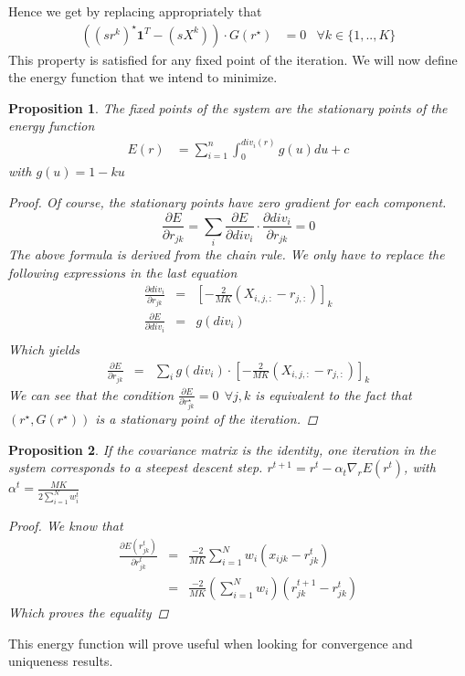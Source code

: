 \documentclass[12pt,a4paper]{article}
\newtheorem{proposition}{Proposition}
\begin{document}
Hence we get by replacing appropriately that
\begin{align*}
((sr^k)^{\star} \mathbf{1}^T - (sX^k))\cdot G(r^{\star}) &= 0 & \forall k\in \{1,..,K\}
\end{align*}
This property is satisfied for any fixed point of the iteration. We will now define the energy function that we intend to minimize.
\begin{proposition}
The fixed points of the system are the stationary points of the energy function
\begin{align}
E(r) &=  \sum_{i=1}^n \int_0^{div_i(r)}g(u) du + c \label{eq:energy}
\end{align}
with $g(u) = 1 -ku$
\begin{proof}
Of course, the stationary points have zero gradient for each component.
$$
\frac{\partial E}{\partial r_{jk}} =  \sum_{i}\frac{\partial E}{\partial div_i} \cdot \frac{\partial div_i}{\partial r_{jk}} = 0
$$
The above formula is derived from the chain rule. We only have to replace the following expressions in the last equation
\begin{eqnarray*}
\frac{\partial div_i}{\partial r_{jk}} & = & \left[-\frac{2}{MK} (X_{i,j,:}-r_{j,:})\right]_{k} \\
\frac{\partial E}{\partial div_i} & = & g(div_i)\\
\end{eqnarray*}
Which yields
\begin{eqnarray*}
\frac{\partial E}{\partial r_{jk}} & = & \sum_{i}g(div_i) \cdot \left[-\frac{2}{MK} (X_{i,j,:}-r_{j,:})\right]_{k} 
\end{eqnarray*}
We can see that the condition $\frac{\partial E}{\partial r^{\star}_{jk}}=0 \:\: \forall j,k$ is equivalent to the fact that $(r^{\star},G(r^{\star}))$ is a stationary point of the iteration.
\end{proof}
\end{proposition}
\begin{proposition}
If the covariance matrix is the identity, one iteration in the system corresponds to a steepest descent step.
$r^{t+1} = r^t - \alpha_t \nabla_r E(r^t)$, with $\alpha^t = \frac{MK}{2 \sum_{i=1}^N w^t_i}$
\begin{proof}
We know that 
\begin{eqnarray*}
\frac{\partial E(r^t_{jk})}{\partial r^t_{jk}} & = & \frac{-2}{MK} \sum_{i=1}^N w_i (x_{ijk}-r^t_{jk})\\
& = & \frac{-2}{MK} (\sum_{i=1}^N w_i)(r^{t+1}_{jk}- r^t_{jk})
\end{eqnarray*}
Which proves the equality
\end{proof}
\end{proposition}
This energy function will prove useful when looking for convergence and uniqueness results.
\end{document}
